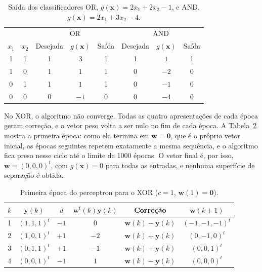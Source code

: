 \documentclass[12pt,a4paper]{article}
\begin{document}
\begin{table}[H]
\centering
\caption{Saída dos classificadores OR, $g(\mathbf{x}) = 2x_1 + 2x_2 - 1$, e AND, $g(\mathbf{x}) = 2x_1 + 3x_2 - 4$.}
\label{tab:or_and}
\begin{tabular}{cc|ccc|ccc}
\toprule
 & & \multicolumn{3}{c|}{OR} & \multicolumn{3}{c}{AND} \\
$x_1$ & $x_2$ & Desejada & $g(\mathbf{x})$ & Saída & Desejada & $g(\mathbf{x})$ & Saída \\
\midrule
1 & 1 & 1 & $3$  & 1 & 1 & $1$  & 1 \\
1 & 0 & 1 & $1$  & 1 & 0 & $-2$ & 0 \\
0 & 1 & 1 & $1$  & 1 & 0 & $-1$ & 0 \\
0 & 0 & 0 & $-1$ & 0 & 0 & $-4$ & 0 \\
\bottomrule
\end{tabular}
\end{table}

No XOR, o algoritmo não converge. Todas as quatro apresentações de cada época geram correção, e o vetor peso volta a ser nulo no fim de cada época. A Tabela~\ref{tab:xor} mostra a primeira época: como ela termina em $\mathbf{w} = \mathbf{0}$, que é o próprio vetor inicial, as épocas seguintes repetem exatamente a mesma sequência, e o algoritmo fica preso nesse ciclo até o limite de 1000 épocas. O vetor final é, por isso, $\mathbf{w} = (0, 0, 0)^t$, com $g(\mathbf{x}) = 0$ para todas as entradas, e nenhuma superfície de separação é obtida.

\begin{table}[H]
\centering
\caption{Primeira época do perceptron para o XOR ($c = 1$, $\mathbf{w}(1) = \mathbf{0}$).}
\label{tab:xor}
\begin{tabular}{cccccc}
\toprule
$k$ & $\mathbf{y}(k)$ & $d$ & $\mathbf{w}^t(k)\mathbf{y}(k)$ & Correção & $\mathbf{w}(k+1)$ \\
\midrule
1 & $(1,1,1)^t$ & $-1$ & $0$  & $\mathbf{w}(k) - \mathbf{y}(k)$ & $(-1,-1,-1)^t$ \\
2 & $(1,0,1)^t$ & $+1$ & $-2$ & $\mathbf{w}(k) + \mathbf{y}(k)$ & $(0,-1,0)^t$ \\
3 & $(0,1,1)^t$ & $+1$ & $-1$ & $\mathbf{w}(k) + \mathbf{y}(k)$ & $(0,0,1)^t$ \\
4 & $(0,0,1)^t$ & $-1$ & $1$  & $\mathbf{w}(k) - \mathbf{y}(k)$ & $(0,0,0)^t$ \\
\bottomrule
\end{tabular}
\end{table}
\end{document}
